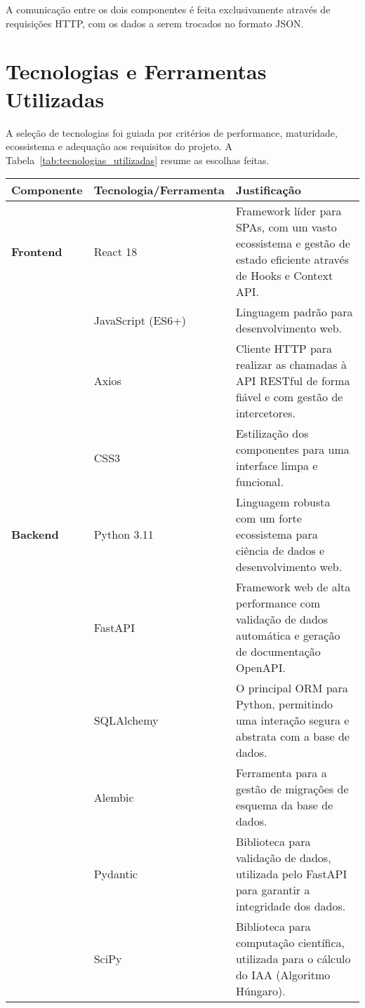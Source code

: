 A comunicação entre os dois componentes é feita exclusivamente através de requisições HTTP, com os dados a serem trocados no formato JSON.

\section{Tecnologias e Ferramentas Utilizadas}

A seleção de tecnologias foi guiada por critérios de performance, maturidade, ecossistema e adequação aos requisitos do projeto. A Tabela~\ref{tab:tecnologias_utilizadas} resume as escolhas feitas.

\begin{table}[h!]
    \centering
    \begin{tabular}{|l|l|p{}|}
        \hline
        \textbf{Componente} & \textbf{Tecnologia/Ferramenta} & \textbf{Justificação} \\
        \hline
        \textbf{Frontend} & React 18 & Framework líder para SPAs, com um vasto ecossistema e gestão de estado eficiente através de Hooks e Context API. \\
        & JavaScript (ES6+) & Linguagem padrão para desenvolvimento web. \\
        & Axios & Cliente HTTP para realizar as chamadas à API RESTful de forma fiável e com gestão de intercetores. \\
        & CSS3 & Estilização dos componentes para uma interface limpa e funcional. \\
        \hline
        \textbf{Backend} & Python 3.11 & Linguagem robusta com um forte ecossistema para ciência de dados e desenvolvimento web. \\
        & FastAPI & Framework web de alta performance com validação de dados automática e geração de documentação OpenAPI. \\
        & SQLAlchemy & O principal ORM para Python, permitindo uma interação segura e abstrata com a base de dados. \\
        & Alembic & Ferramenta para a gestão de migrações de esquema da base de dados. \\
        & Pydantic & Biblioteca para validação de dados, utilizada pelo FastAPI para garantir a integridade dos dados. \\
        & SciPy & Biblioteca para computação científica, utilizada para o cálculo do IAA (Algoritmo Húngaro). \\

\end{tabular}
\end{table}
